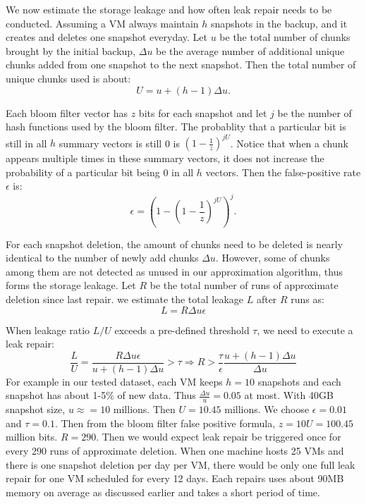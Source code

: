 We now estimate the storage leakage and how often leak repair needs to be conducted.
Assuming a VM always maintain $h$ snapshots in the backup, and it creates and deletes one snapshot
everyday. Let $u$ be the total number of chunks brought by the initial backup, $\Delta u$ be the average
number of additional unique chunks added from one snapshot to the next snapshot. Then the total number of unique
chunks used is about:
\[
U = u + (h-1)\Delta u.
\]

Each bloom filter vector has  $z$ bits for each snapshot and let $j$ be the number of hash functions used by the
bloom filter. The probablity that a particular bit is still in all $h$ summary vectors is still 0 is 
$(1- \frac{1}{z}) ^{j U}$. Notice that when a chunk appears multiple times in these summary vectors, it does not 
increase the probability of a particular bit being 0 in all $h$ vectors.
Then the false-positive rate $\epsilon$ is: 
\[
\epsilon = (1-(1-\frac{1}{z})^{jU})^j.
\]

For each snapshot deletion, the amount of chunks need to be deleted is nearly identical to the number of
newly add chunks $\Delta u$. However, some of chunks among them are not detected as unused in our approximation
algorithm, thus forms the storage leakage. Let $R$ be the total number of runs of approximate deletion since
last repair. we estimate  the total leakage $L$ after $R$ runs as:
\[
L = R \Delta u \epsilon
\]

When leakage ratio $L/U$ exceeds a pre-defined threshold $\tau$, we need to execute a leak repair:
\[
\frac{L}{U} = \frac{R \Delta u \epsilon}{u+(h-1)\Delta u } > \tau 
\Longrightarrow R > \frac{\tau}{\epsilon}\frac{u + (h-1)\Delta u}{\Delta u}
\]
For example in our tested dataset,  
each VM keeps $h=10$ snapshots and each snapshot has
about 1-5\% of new data. Thus $\frac{\Delta u}{u}=0.05$ at most. With 40GB snapshot size, $u\approx = 10$ millions.
Then $U=10.45$ millions.
We choose  $\epsilon = 0.01$ and $\tau=0.1$. Then from the bloom filter  false positive formula, 
$z=10U=100.45$ million bits. $R=290$.
Then we would expect leak repair be triggered once for 
every 290 runs of approximate deletion. 
When one machine hosts 25 VMs and there is one snapshot deletion per day per VM, there would be 
only one full leak repair for one VM scheduled for every 12 days. Each repairs uses about 90MB memory on average
as discussed earlier and takes a short period of time.
